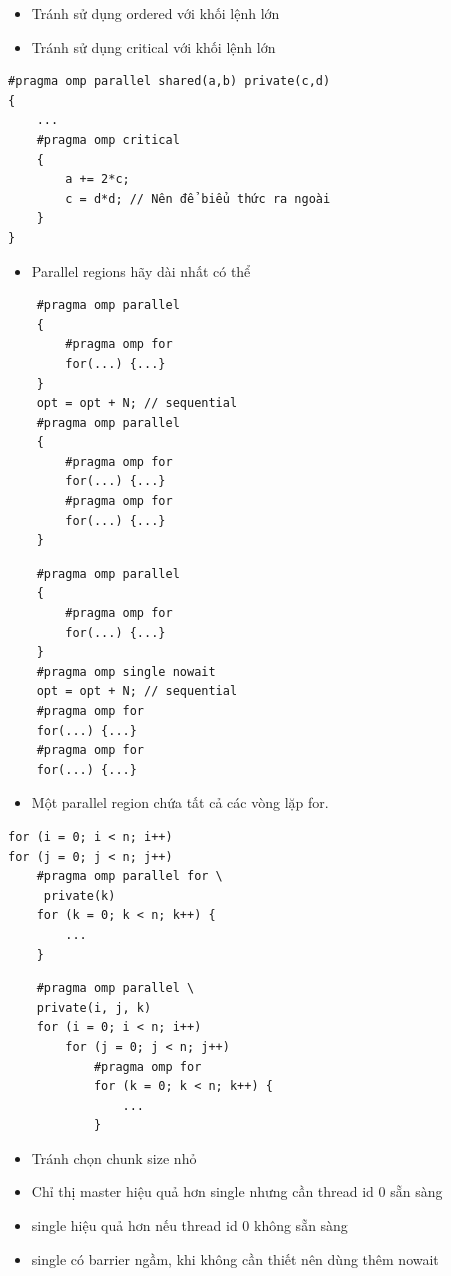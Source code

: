 \documentclass[14pt, a4paper]{article}
\numberwithin{equation}{section}
\numberwithin{figure}{section}
\numberwithin{dl}{section}
\numberwithin{md}{section}
\numberwithin{bd}{section}
\numberwithin{dn}{section}
\numberwithin{hq}{section}
\begin{document}
\begin{itemize}
    \item Tránh sử dụng ordered với khối lệnh lớn
    \item Tránh sử dụng critical với khối lệnh lớn
\end{itemize}
\begin{verbatim}
#pragma	omp	parallel shared(a,b) private(c,d)	
{	
    ...	
    #pragma	omp	critical
    {	
        a += 2*c;	
        c =	d*d; // Nên để biểu thức ra ngoài
    }	
}	
\end{verbatim}

\begin{itemize}
        \item Parallel regions hãy dài nhất có thể
\end{itemize}

\begin{verbatim}
    #pragma	omp	parallel		
    {	
        #pragma	omp	for	
        for(...) {...}	
    }	
    opt = opt +	N; // sequential
    #pragma	omp	parallel	
    {	
        #pragma	omp	for	
        for(...) {...}	
        #pragma	omp	for	
        for(...) {...}	
    }    
\end{verbatim}

\begin{verbatim}
    #pragma	omp	parallel		
    {	
        #pragma	omp	for	
        for(...) {...}	
    }
    #pragma omp single nowait
    opt = opt +	N; // sequential	
    #pragma	omp	for	
    for(...) {...}	
    #pragma	omp	for	
    for(...) {...}	
\end{verbatim}

\begin{itemize}
    \item Một parallel region chứa tất cả các vòng lặp for.
\end{itemize}

\begin{verbatim}
for (i = 0; i < n; i++)
for (j = 0; j < n; j++)
    #pragma omp parallel for \ 
     private(k)
    for (k = 0; k < n; k++) {
        ...
    }
\end{verbatim}

\begin{verbatim}
    #pragma omp parallel \
    private(i, j, k)
    for (i = 0; i < n; i++)
        for (j = 0; j < n; j++)
            #pragma omp for
            for (k = 0; k < n; k++) {
                ...
            }
\end{verbatim}

\begin{itemize}
    \item Tránh chọn chunk size nhỏ
    \item Chỉ thị master hiệu quả hơn single nhưng cần thread id 0 sẵn sàng
    \item single hiệu quả hơn nếu thread id 0 không sẵn sàng
    \item single có barrier ngầm, khi không cần thiết nên dùng thêm nowait
\end{itemize}
\end{document}
